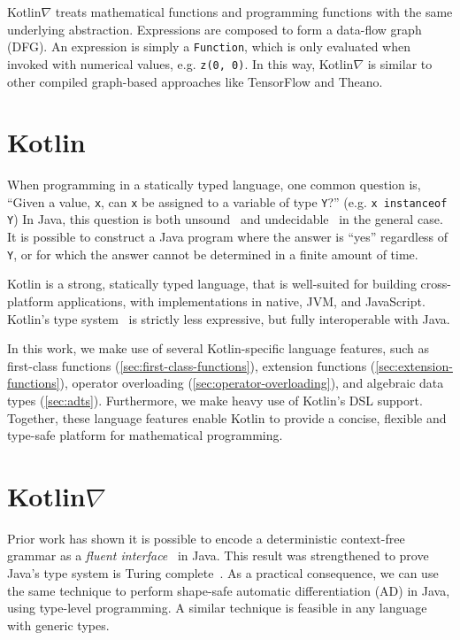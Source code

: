 \documentclass[12pt,initial,twoside,maitrise]{dms}
\def\inline{\lstinline[basicstyle=\ttfamily]}
\numberwithin{equation}{section}
\numberwithin{table}{chapter}
\numberwithin{figure}{chapter}
\begin{document}
Kotlin$\nabla$ treats mathematical functions and programming functions with the same underlying abstraction. Expressions are composed to form a data-flow graph (DFG). An expression is simply a \inline{Function}, which is only evaluated when invoked with numerical values, e.g. \inline{z(0, 0)}. In this way, Kotlin$\nabla$ is similar to other compiled graph-based approaches like TensorFlow and Theano.

\section{Kotlin}\label{sec:kotlin}

When programming in a statically typed language, one common question is, ``Given a value, \inline{x}, can \inline{x} be assigned to a variable of type \inline{Y}?'' (e.g. \inline{x instanceof Y}) In Java, this question is both unsound~\citep{amin2016java} and undecidable~\citep{Grigore:2017:JGT:3009837.3009871} in the general case. It is possible to construct a Java program where the answer is ``yes'' regardless of \inline{Y}, or for which the answer cannot be determined in a finite amount of time.

Kotlin is a strong, statically typed language, that is well-suited for building cross-platform applications, with implementations in native, JVM, and JavaScript. Kotlin's type system~\citep{tate2013mixed} is strictly less expressive, but fully interoperable with Java.

In this work, we make use of several Kotlin-specific language features, such as first-class functions (\ref{sec:first-class-functions}), extension functions (\ref{sec:extension-functions}), operator overloading (\ref{sec:operator-overloading}), and algebraic data types (\ref{sec:adts}). Furthermore, we make heavy use of Kotlin's DSL support. Together, these language features enable Kotlin to provide a concise, flexible and type-safe platform for mathematical programming.

\section{Kotlin$\nabla$}\label{sec:kotlingrad}

Prior work has shown it is possible to encode a deterministic context-free grammar as a \textit{fluent interface}~\citep{gil2016formal} in Java. This result was strengthened to prove Java's type system is Turing complete~\citep{Grigore:2017:JGT:3009837.3009871}. As a practical consequence, we can use the same technique to perform shape-safe automatic differentiation (AD) in Java, using type-level programming. A similar technique is feasible in any language with generic types.
\end{document}
